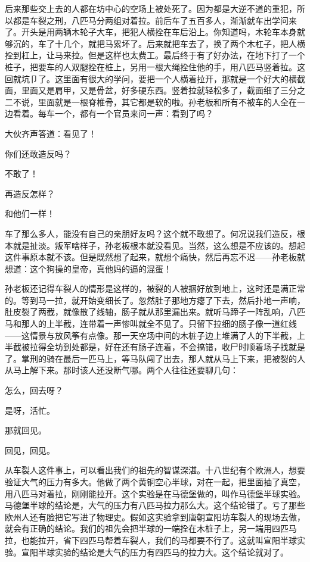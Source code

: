 后来那些交上去的人都在坊中心的空场上被处死了。因为都是大逆不道的重犯，所以都是车裂之刑，八匹马分两组对着拉。前后车了五百多人，渐渐就车出学问来了。开头是用两辆木轮子大车，把犯人横拴在车后沿上。你知道吗，木轮车本身就够沉的，车了十几个，就把马累坏了。后来就把车去了，换了两个木杠子，把人横拴到杠上，让马来拉。但是这样也太费工。最后终于有了好办法，在地下打了一个桩子，把要车的人双腿拴在桩上，另用一根大绳拴住他的手，用八匹马竖着拉。这回就坑卩了。这里面有很大的学问，要把一个人横着拉开，那就是一个好大的横截面，里面又是肩甲，又是骨盆，好多硬东西。竖着拉就轻松多了，截面细了三分之二不说，里面就是一根脊椎骨，其它都是软的啦。孙老板和所有不被车的人全在一边看着。每车一个，都有一个官员来问一声：看到了吗？ 

大伙齐声答道：看见了！ 

你们还敢造反吗？ 

不敢了！ 

再造反怎样？ 

和他们一样！ 

车了那么多人，能没有自己的亲朋好友吗？这个就不敢想了。何况说我们造反，根本就是扯淡。叛军啥样子，孙老板根本就没看见。当然，这么想是不应该的。想起这件事原本就不该。但是既然想了起来，就想个痛快，然后再忘不迟——孙老板就想道：这个狗操的皇帝，真他妈的逼的混蛋！ 

孙老板还记得车裂人的情形是这样的，被裂的人被捆好放到地上，这时还是满正常的。等到马一拉，就开始变细长了。忽然肚子那地方瘪了下去，然后扑地一声响，肚皮裂了两截，就像散了线轴，肠子就从那里漏出来。就听马蹄子一阵乱响，八匹马和那人的上半截，连带着一声惨叫就全不见了。只留下拉细的肠子像一道红线——这情景与放风筝有点像。那一天空场中间的木桩子边上堆满了人的下半截，上半截被拉得全坊到处都是，好在还有肠子连着，不会搞错，收尸时顺着场子找就是了。掌刑的骑在最后一匹马上，等马队闯了出去，那人就从马上下来，把被裂的人从马上解下来。那时该人还没断气哪。两个人往往还要聊几句： 

怎么，回去呀？ 

是呀，活忙。 

那就回见。 

回见，回见。 

从车裂人这件事上，可以看出我们的祖先的智谋深湛。十八世纪有个欧洲人，想要验证大气的压力有多大。他做了两个黄铜空心半球，对在一起，把里面抽了真空，用八匹马对着拉，刚刚能拉开。这个实验是在马德堡做的，叫作马德堡半球实验。马德堡半球的结论是，大气的压力有八匹马拉力那么大。这个结论错了。亏了那些欧州人还有脸把它写进了物理史。假如这实验拿到唐朝宣阳坊车裂人的现场去做，就会有正确的结论。我们的祖先会把半球的一端拴在木桩子上，另一端用四匹马拉，也能拉开，省下四匹马帮着车裂人，我们的马都要不行了。这就叫宣阳半球实验。宣阳半球实验的结论是大气的压力有四匹马的拉力大。这个结论就对了。 

